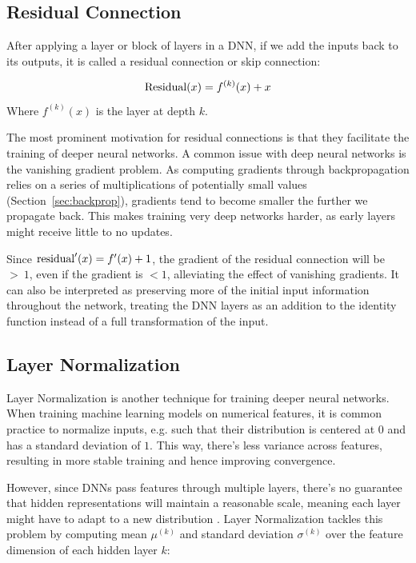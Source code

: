 \subsection{Residual Connection}
After applying a layer or block of layers in a DNN, if we add the inputs back to its outputs, it is called a residual connection or skip connection:

\begin{equation}
    \text{Residual}(x) = f^{(k)}(x) + x
\end{equation}
Where $f^{(k)}(x)$ is the layer at depth $k$.

The most prominent motivation for residual connections is that they facilitate the training of deeper neural networks. A common issue with deep neural networks is the vanishing gradient problem. As computing gradients through backpropagation relies on a series of multiplications of potentially small values (Section~\ref{sec:backprop}), gradients tend to become smaller the further we propagate back. This makes training very deep networks harder, as early layers might receive little to no updates.

Since $\text{residual}'(x) = f'(x) + 1$, the gradient of the residual connection will be $>~1$, even if the gradient is $<1$, alleviating the effect of vanishing gradients. It can also be interpreted as preserving more of the initial input information throughout the network, treating the DNN layers as an addition to the identity function instead of a full transformation of the input.

\subsection{Layer Normalization}
Layer Normalization \cite{ba2016layer} is another technique for training deeper neural networks. When training machine learning models on numerical features, it is common practice to normalize inputs, e.g. such that their distribution is centered at $0$ and has a standard deviation of $1$. This way, there's less variance across features, resulting in more stable training and hence improving convergence.

However, since DNNs pass features through multiple layers, there's no guarantee that hidden representations will maintain a reasonable scale, meaning each layer might have to adapt to a new distribution \cite{DBLP:journals/corr/IoffeS15}. Layer Normalization tackles this problem by computing mean $\mu^{(k)}$ and standard deviation $\sigma^{(k)}$ over the feature dimension of each hidden layer $k$:

